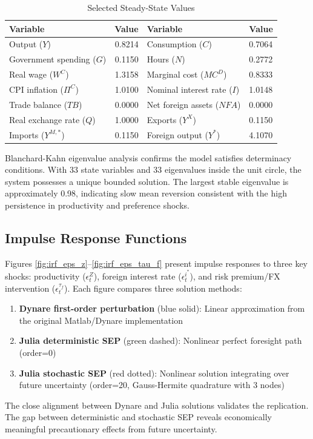 \documentclass[12pt]{article}
\begin{document}
\begin{table}[H]
\centering
\caption{Selected Steady-State Values}\label{tab:steady_state}
\small
\begin{tabular}{lrll}
\toprule
\textbf{Variable} & \textbf{Value} & \textbf{Variable} & \textbf{Value} \\
\midrule
Output ($Y$) & 0.8214 & Consumption ($C$) & 0.7064 \\
Government spending ($G$) & 0.1150 & Hours ($N$) & 0.2772 \\
Real wage ($W^C$) & 1.3158 & Marginal cost ($MC^D$) & 0.8333 \\
CPI inflation ($\Pi^C$) & 1.0100 & Nominal interest rate ($I$) & 1.0148 \\
Trade balance ($TB$) & 0.0000 & Net foreign assets ($NFA$) & 0.0000 \\
Real exchange rate ($Q$) & 1.0000 & Exports ($Y^X$) & 0.1150 \\
Imports ($Y^{M,*}$) & 0.1150 & Foreign output ($Y^*$) & 4.1070 \\
\bottomrule
\end{tabular}
\end{table}

Blanchard-Kahn eigenvalue analysis confirms the model satisfies determinacy conditions. With 33 state variables and 33 eigenvalues inside the unit circle, the system possesses a unique bounded solution. The largest stable eigenvalue is approximately 0.98, indicating slow mean reversion consistent with the high persistence in productivity and preference shocks.

\subsection{Impulse Response Functions}

Figures \ref{fig:irf_eps_z}--\ref{fig:irf_eps_tau_f} present impulse responses to three key shocks: productivity ($\epsilon_t^Z$), foreign interest rate ($\epsilon_t^{i^*}$), and risk premium/FX intervention ($\epsilon_t^{\tau_f}$). Each figure compares three solution methods:
\begin{enumerate}
\item \textbf{Dynare first-order perturbation} (blue solid): Linear approximation from the original Matlab/Dynare implementation
\item \textbf{Julia deterministic SEP} (green dashed): Nonlinear perfect foresight path (order=0)
\item \textbf{Julia stochastic SEP} (red dotted): Nonlinear solution integrating over future uncertainty (order=20, Gauss-Hermite quadrature with 3 nodes)
\end{enumerate}
The close alignment between Dynare and Julia solutions validates the replication. The gap between deterministic and stochastic SEP reveals economically meaningful precautionary effects from future uncertainty.
\end{document}
